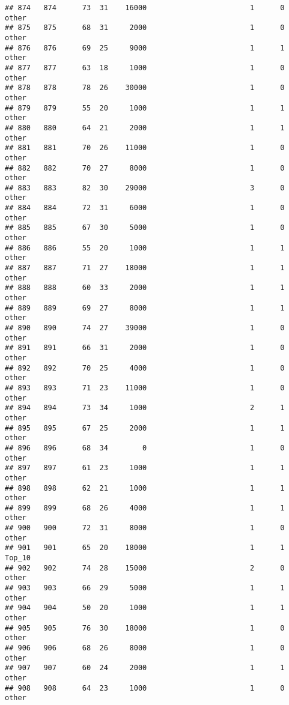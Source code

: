 \documentclass[
]{article}
\begin{document}
\begin{verbatim}
## 874   874      73  31    16000                        1      0    other
## 875   875      68  31     2000                        1      0    other
## 876   876      69  25     9000                        1      1    other
## 877   877      63  18     1000                        1      0    other
## 878   878      78  26    30000                        1      0    other
## 879   879      55  20     1000                        1      1    other
## 880   880      64  21     2000                        1      1    other
## 881   881      70  26    11000                        1      0    other
## 882   882      70  27     8000                        1      0    other
## 883   883      82  30    29000                        3      0    other
## 884   884      72  31     6000                        1      0    other
## 885   885      67  30     5000                        1      0    other
## 886   886      55  20     1000                        1      1    other
## 887   887      71  27    18000                        1      1    other
## 888   888      60  33     2000                        1      1    other
## 889   889      69  27     8000                        1      1    other
## 890   890      74  27    39000                        1      0    other
## 891   891      66  31     2000                        1      0    other
## 892   892      70  25     4000                        1      0    other
## 893   893      71  23    11000                        1      0    other
## 894   894      73  34     1000                        2      1    other
## 895   895      67  25     2000                        1      1    other
## 896   896      68  34        0                        1      0    other
## 897   897      61  23     1000                        1      1    other
## 898   898      62  21     1000                        1      1    other
## 899   899      68  26     4000                        1      1    other
## 900   900      72  31     8000                        1      0    other
## 901   901      65  20    18000                        1      1   Top_10
## 902   902      74  28    15000                        2      0    other
## 903   903      66  29     5000                        1      1    other
## 904   904      50  20     1000                        1      1    other
## 905   905      76  30    18000                        1      0    other
## 906   906      68  26     8000                        1      0    other
## 907   907      60  24     2000                        1      1    other
## 908   908      64  23     1000                        1      0    other

\end{verbatim}
\end{document}
